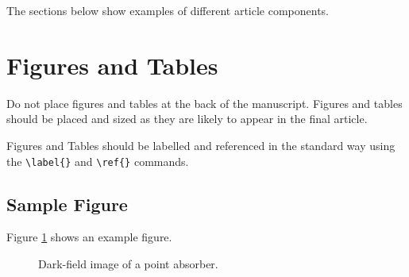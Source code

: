 \documentclass[9pt,twocolumn,twoside]{opticajnl}
\begin{document}

The sections below show examples of different article components.

\section{Figures and Tables}

Do not place figures and tables at the back of the manuscript. Figures and tables should be placed and sized as they are likely to appear in the final article.

Figures and Tables should be labelled and referenced in the standard way using the \verb|\label{}| and \verb|\ref{}| commands.

\subsection{Sample Figure}

Figure \ref{fig:false-color} shows an example figure.

\begin{figure}[ht]
  \centering
  \caption{Dark-field image of a point absorber.}
  \label{fig:false-color}
\end{figure}
\end{document}
